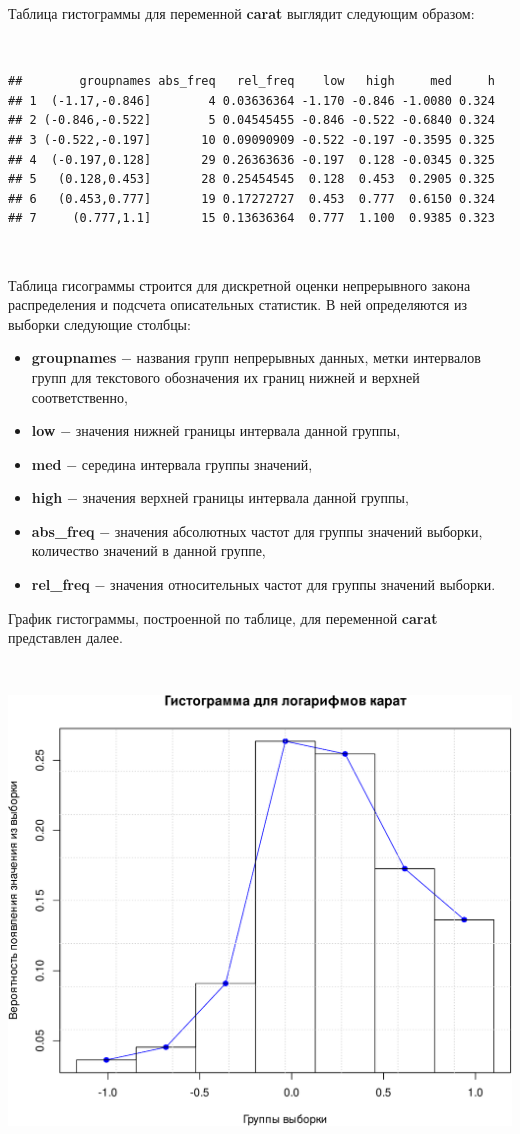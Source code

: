 \documentclass[
]{article}
\begin{document}
Таблица гистограммы для переменной \textbf{carat} выглядит следующим
образом:

\(\ \)

\begin{verbatim}
##        groupnames abs_freq   rel_freq    low   high     med     h
## 1  (-1.17,-0.846]        4 0.03636364 -1.170 -0.846 -1.0080 0.324
## 2 (-0.846,-0.522]        5 0.04545455 -0.846 -0.522 -0.6840 0.324
## 3 (-0.522,-0.197]       10 0.09090909 -0.522 -0.197 -0.3595 0.325
## 4  (-0.197,0.128]       29 0.26363636 -0.197  0.128 -0.0345 0.325
## 5   (0.128,0.453]       28 0.25454545  0.128  0.453  0.2905 0.325
## 6   (0.453,0.777]       19 0.17272727  0.453  0.777  0.6150 0.324
## 7     (0.777,1.1]       15 0.13636364  0.777  1.100  0.9385 0.323
\end{verbatim}

\(\ \)

Таблица гисограммы строится для дискретной оценки непрерывного закона
распределения и подсчета описательных статистик. В ней определяются из
выборки следующие столбцы:

\begin{itemize}
\item
  \textbf{groupnames} \(-\) названия групп непрерывных данных, метки
  интервалов групп для текстового обозначения их границ нижней и верхней
  соответственно,
\item
  \textbf{low} \(-\) значения нижней границы интервала данной группы,
\item
  \textbf{med} \(-\) середина интервала группы значений,
\item
  \textbf{high} \(-\) значения верхней границы интервала данной группы,
\item
  \textbf{abs\_freq} \(-\) значения абсолютных частот для группы
  значений выборки, количество значений в данной группе,
\item
  \textbf{rel\_freq} \(-\) значения относительных частот для группы
  значений выборки.
\end{itemize}

График гистограммы, построенной по таблице, для переменной
\textbf{carat} представлен далее.

\(\ \)

\begin{center}\includegraphics[width=0.6\linewidth]{Prac5_files/figure-latex/unnamed-chunk-6-1} \end{center}
\end{document}
